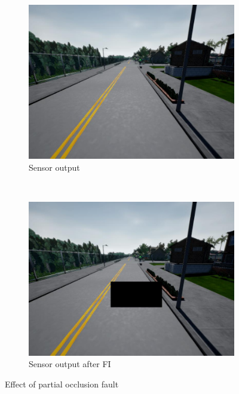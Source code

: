  \begin{figure}[h]
 	\vspace{-0.5em}
 	\centering
 	\begin{subfigure}[b]{0.23\textwidth}
 		\includegraphics[scale=0.15]{pure_data}
 		\caption{Sensor output}
 		\label{fig:fs_example}
 	\end{subfigure}
 	~ 
 	\begin{subfigure}[b]{0.23\textwidth}
 		\includegraphics[scale=0.15]{faulty_data}
 		\caption{Sensor output after FI}
 		\label{fig:fc_example}
 	\end{subfigure}
 	
 	\caption{Effect of partial occlusion fault}
 	\label{fig:partial_occlusion}
 	\vspace{1.5em}
 \end{figure}
 
